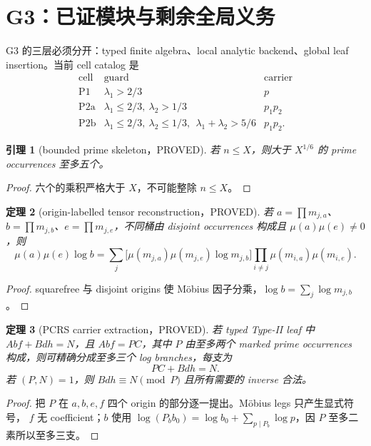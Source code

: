 \documentclass[11pt,a4paper]{ctexart}
\newtheorem{theorem}{定理}[section]
\newtheorem{lemma}[theorem]{引理}
\theoremstyle{definition}
\newcommand{\1}{\mathbf 1}
\newcommand{\PROVED}{\textcolor{green!40!black}{\textsf{PROVED}}}
\begin{document}
\section{G3：已证模块与剩余全局义务}
\label{sec:g3}

G3 的三层必须分开：typed finite algebra、local analytic backend、global leaf
insertion。当前 cell catalog 是
\[
\begin{array}{c|c|c}
\text{cell}&\text{guard}&\text{carrier}\\ \hline
\mathrm{P1}&\lambda_1>2/3&p\\
\mathrm{P2a}&\lambda_1\le2/3,\ \lambda_2>1/3&p_1p_2\\
\mathrm{P2b}&\lambda_1\le2/3,\ \lambda_2\le1/3,\
\ \lambda_1+\lambda_2>5/6&p_1p_2.
\end{array}                                           \tag{G3.1}
\]

\begin{lemma}[bounded prime skeleton，\PROVED]
若 $n\le X$，则大于 $X^{1/6}$ 的 prime occurrences 至多五个。
\end{lemma}
\begin{proof}
六个的乘积严格大于 $X$，不可能整除 $n\le X$。
\end{proof}

\begin{theorem}[origin-labelled tensor reconstruction，\PROVED]
若 $a=\prod m_{j,a}$、$b=\prod m_{j,b}$、$e=\prod m_{j,e}$，不同桶由
disjoint occurrences 构成且 $\mu(a)\mu(e)\ne0$，则
\[
 \mu(a)\mu(e)\log b
 =\sum_j\bigl[\mu(m_{j,a})\mu(m_{j,e})\log m_{j,b}\bigr]
 \prod_{i\ne j}\mu(m_{i,a})\mu(m_{i,e}).            \tag{G3.2}
\]
\end{theorem}
\begin{proof}
squarefree 与 disjoint origins 使 Möbius 因子分乘，$\log b=\sum_j\log m_{j,b}$。
\end{proof}

\begin{theorem}[PCRS carrier extraction，\PROVED]
若 typed Type-II leaf 中 $Abf+Bdh=N$，且 $Abf=PC$，其中 $P$ 由至多两个
marked prime occurrences 构成，则可精确分成至多三个 log branches，每支为
\[
 PC+Bdh=N.                                            \tag{G3.3}
\]
若 $(P,N)=1$，则 $Bdh\equiv N\pmod P$ 且所有需要的 inverse 合法。
\end{theorem}
\begin{proof}
把 $P$ 在 $a,b,e,f$ 四个 origin 的部分逐一提出。Möbius legs 只产生显式符号，
$f$ 无 coefficient；$b$ 使用
$\log(P_bb_0)=\log b_0+\sum_{p\mid P_b}\log p$，因 $P$ 至多二素所以至多三支。
\end{proof}
\end{document}
